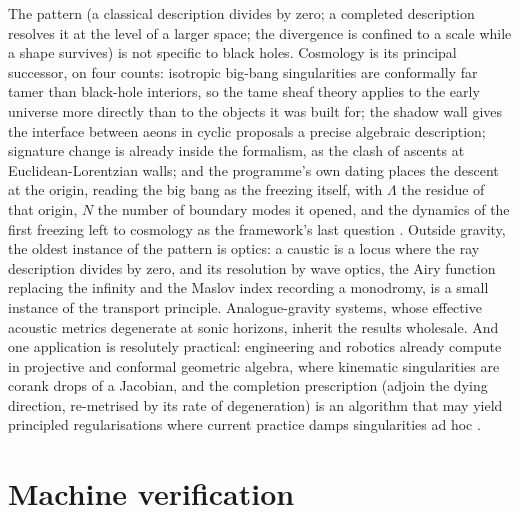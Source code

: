 \documentclass[11pt]{article}
\theoremstyle{definition}
\begin{document}
The pattern (a classical description divides by zero; a completed description resolves it at the level of a larger space; the divergence is confined to a scale while a shape survives) is not specific to black holes. Cosmology is its principal successor, on four counts: isotropic big-bang singularities are conformally far tamer than black-hole interiors, so the tame sheaf theory applies to the early universe more directly than to the objects it was built for; the shadow wall gives the interface between aeons in cyclic proposals a precise algebraic description; signature change is already inside the formalism, as the clash of ascents at Euclidean-Lorentzian walls; and the programme's own dating places the descent at the origin, reading the big bang as the freezing itself, with $\Lambda$ the residue of that origin, $N$ the number of boundary modes it opened, and the dynamics of the first freezing left to cosmology as the framework's last question \cite{ButlerT12, ButlerT14}. Outside gravity, the oldest instance of the pattern is optics: a caustic is a locus where the ray description divides by zero, and its resolution by wave optics, the Airy function replacing the infinity and the Maslov index recording a monodromy, is a small instance of the transport principle. Analogue-gravity systems, whose effective acoustic metrics degenerate at sonic horizons, inherit the results wholesale. And one application is resolutely practical: engineering and robotics already compute in projective and conformal geometric algebra, where kinematic singularities are corank drops of a Jacobian, and the completion prescription (adjoin the dying direction, re-metrised by its rate of degeneration) is an algorithm that may yield principled regularisations where current practice damps singularities ad hoc \cite{ButlerT2}.


\section{Machine verification}\label{sec:verification}
\end{document}
